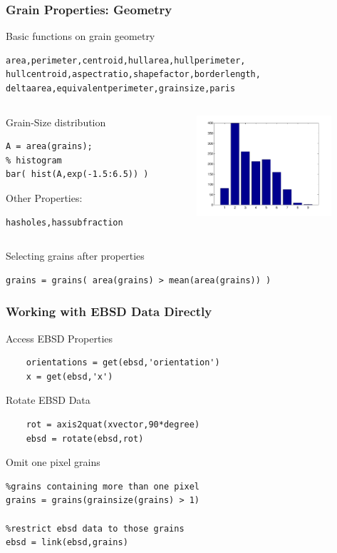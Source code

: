 %
\begin{frame}[fragile]
  \frametitle{Grain Properties: Geometry}

Basic functions on grain geometry
\begin{lstlisting}[basicstyle=\footnotesize]
area,perimeter,centroid,hullarea,hullperimeter,
hullcentroid,aspectratio,shapefactor,borderlength,
deltaarea,equivalentperimeter,grainsize,paris
\end{lstlisting}
%

\begin{columns}[t]
  \begin{column}[T]{6.5cm}
  Grain-Size distribution
\begin{lstlisting}
A = area(grains);
% histogram
bar( hist(A,exp(-1.5:6.5)) )
\end{lstlisting}

Other Properties:
\begin{lstlisting}[basicstyle=\footnotesize]
hasholes,hassubfraction
\end{lstlisting}

	\end{column}
	\begin{column}[T]{5cm}
		\includegraphics[width=5cm]{pic/grh}
	\end{column}
\end{columns}

Selecting grains after properties
\begin{lstlisting}
grains = grains( area(grains) > mean(area(grains)) )
\end{lstlisting}

\end{frame}


%
\begin{frame}[fragile]
  \frametitle{Working with EBSD Data Directly}

	Access EBSD Properties
\begin{lstlisting}
	orientations = get(ebsd,'orientation')
	x = get(ebsd,'x')
\end{lstlisting}

	\medskip

	Rotate EBSD Data
\begin{lstlisting}
	rot = axis2quat(xvector,90*degree)
	ebsd = rotate(ebsd,rot)
\end{lstlisting}

	\medskip
        Omit one pixel grains
\begin{lstlisting}
%grains containing more than one pixel
grains = grains(grainsize(grains) > 1)

%restrict ebsd data to those grains
ebsd = link(ebsd,grains)
\end{lstlisting}

\end{frame}

